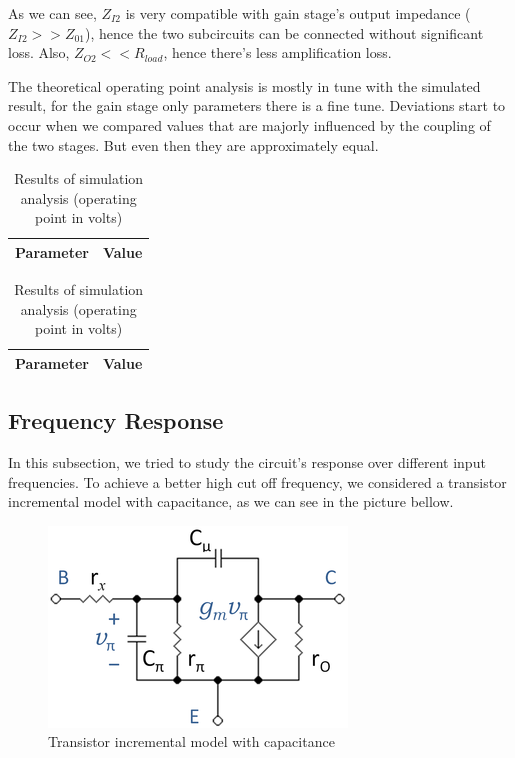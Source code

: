 As we can see, $Z_{I2}$ is very compatible with gain stage's output impedance ($Z_{I2}>>Z_{01}$), hence the two subcircuits can be connected without significant loss. Also, $Z_{O2}<<R_{load}$, hence there's less amplification loss.


The theoretical operating point analysis is mostly in tune with the simulated result, for the gain stage only parameters there is a fine tune. Deviations start to occur when we compared values that are majorly influenced by the coupling of the two stages. But even then they are approximately equal.

\begin{table}[!htb]
  \begin{minipage}{.5\linewidth}
     \centering
  \begin{tabular}{|c|c|}
    \hline    
    {\bf Parameter} & {\bf Value} \\ \hline
    
 \end{tabular}
 \caption{Results of theoretical analysis (operating point in volts)}
 \label{tab:merit}
  \end{minipage}%
    \hspace{2 mm}
    \begin{minipage}{.5\linewidth}
      \centering
        \begin{tabular}{|c|c|}
    \hline    
    {\bf Parameter} & {\bf Value} \\ \hline
    
 \end{tabular}
        \caption{Results of simulation analysis (operating point in volts)}
        \label{compmerit}
    \end{minipage} 
\end{table}
\newpage
\subsection{Frequency Response}
 In this subsection, we tried to study the circuit's response over different input frequencies. To achieve a better high cut off frequency, we considered a transistor incremental model with capacitance, as we can see in the picture bellow.
 
 \begin{figure}[h] \centering
\includegraphics[width=0.4\linewidth]{transistor.png}
\vspace{-3mm}
\caption{Transistor incremental model with capacitance}\label{fig:rc}
\end{figure}

